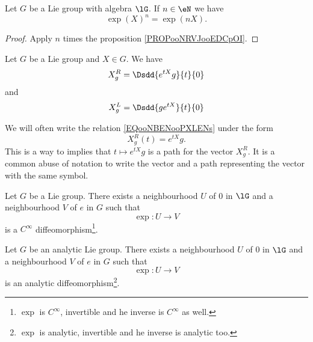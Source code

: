 \begin{lemma}       \label{LEMooRPHVooAtZJnz}
    Let \( G\) be a Lie group with algebra \( \lG\). If \( n\in \eN\) we have
    \begin{equation}
        \exp(X)^n=\exp(nX).
    \end{equation}
\end{lemma}

\begin{proof}
    Apply \( n\) times the proposition \ref{PROPooNRVJooEDCpOI}.
\end{proof}

\begin{lemma}       \label{LEMooLMTZooCvunSl}
    Let \( G\) be a Lie group and \( X\in G\). We have
    \begin{equation}        \label{EQooNBENooPXLENs}
        X^R_g=\Dsdd{  e^{tX}g }{t}{0}
    \end{equation}
    and
    \begin{equation}
        X^L_g=\Dsdd{  ge^{tX} }{t}{0}
    \end{equation}
\end{lemma}

\begin{normaltext}      \label{NORMooSATDooIhwXXr}
    We will often write the relation \eqref{EQooNBENooPXLENs} under the form
    \begin{equation}
        X^R_g(t)= e^{tX}g.
    \end{equation}
    This is a way to implies that \( t\mapsto  e^{tX}g\) is a path for the vector \( X^R_g\). It is a common abuse of notation to write the vector and a path representing the vector with the same symbol.
\end{normaltext}

\begin{proposition}     \label{PROPooYFZZooLUOuOj}
    Let \( G\) be a Lie group. There exists a neighbourhood \( U\) of \( 0\) in \( \lG\) and a neighbourhood \( V\) of \( e\) in \( G\) such that
    \begin{equation}
        \exp\colon U\to V
    \end{equation}
    is a \(  C^{\infty}\) diffeomorphism\footnote{\( \exp\) is \(  C^{\infty}\), invertible and he inverse is \(  C^{\infty}\) as well.}.
\end{proposition}

\begin{proposition}     \label{PROPooAICDooQcmPZB}
    Let \( G\) be an analytic Lie group. There exists a neighbourhood \( U\) of \( 0\) in \( \lG\) and a neighbourhood \( V\) of \( e\) in \( G\) such that
    \begin{equation}
        \exp\colon U\to V
    \end{equation}
    is an analytic diffeomorphism\footnote{\( \exp\) is analytic, invertible and he inverse is analytic too.}.
\end{proposition}



